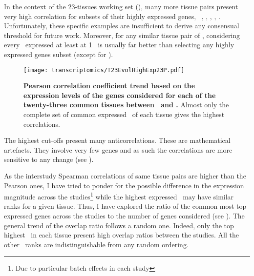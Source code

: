 In the context of the 23-tissues working set (),
many more tissue pairs present very high correlation for subsets of their highly
expressed genes, \ie\ \skeletal, \Thyroid, \Cortex, \Uterus, \Kidney.
Unfortunately, these specific examples are insufficient
to derive any consensual threshold for future work.
Moreover,
for any similar tissue pair of \setTwo,
considering every \pcg\ expressed at least at 1 \FPKM\ is usually
far better than selecting any highly expressed genes subset
(except for \kidney).

\begin{figure}[!htpb]
    \texttt{[image: transcriptomics/T23EvolHighExp23P.pdf]}\centering
    \caption[Pearson correlation coefficient trend based on the expression
    levels of the genes considered for each of the 23 common tissues]{%
\label{fig:CorHighExp23T}\textbf{Pearson correlation coefficient trend based
on the expression levels of the genes considered
for each of the twenty-three common tissues between \uhlen\ and \gtex.}
Almost only the complete set of common expressed \pcgs\ of each tissue gives
the highest correlations.}
\end{figure}

The highest cut-offs present many anticorrelations.
These are mathematical artefacts.
They involve very few genes
and as such the correlations are more sensitive to any change
(see ).

As the interstudy Spearman correlations of same tissue pairs
are higher than the Pearson ones,
I have tried to ponder for the possible difference in the expression magnitude
across the studies\footnote{Due to particular batch effects in each study}
while the highest expressed \pc\ may have similar ranks
for a given tissue.
Thus, I have explored the ratio of the common most top expressed
genes across the studies to the number of genes considered
(see ).
The general trend of the overlap ratio follows a random one.
Indeed, only the top highest \pcgs\ in each tissue
present high overlap ratios between the studies.
All the other \pcg\ ranks are indistinguishable from any random ordering.

\begin{comment}
While a study of the highly expressed \pcgs\ is interesting,
its ability on explaining the underlying reasons
of the strong interstudy tissue correlations seems limited at best
or even inadequate.
\end{comment}


